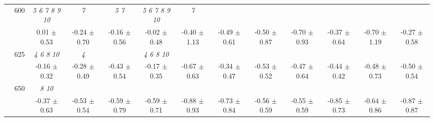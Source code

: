 \begin{table}[h]
{\begin{tabular}{
        ccccccccccccc}
 & \multirow{2}{*}{600}& \textit{  5  6  7  8  9 10 }& \textit{ 7 }& \textit{ 5 7 }& \textit{  5  6  7  8  9 10 }& \textit{ 7 }& & & & & &  \\ 
 & & 0.01 $\pm$ 0.53& -0.24 $\pm$ 0.70& -0.16 $\pm$ 0.56& -0.02 $\pm$ 0.48& -0.40 $\pm$ 1.13& -0.49 $\pm$ 0.61& -0.50 $\pm$ 0.87& -0.70 $\pm$ 0.93& -0.37 $\pm$ 0.64& -0.70 $\pm$ 1.19& -0.27 $\pm$ 0.58 \\ 
 & \multirow{2}{*}{625}& \cellcolor[HTML]{EFEFEF} \textit{  4  6  8 10 }& \cellcolor[HTML]{EFEFEF} \textit{ 4 }& \cellcolor[HTML]{EFEFEF} & \cellcolor[HTML]{EFEFEF} \textit{  4  6  8 10 }& \cellcolor[HTML]{EFEFEF} & \cellcolor[HTML]{EFEFEF} & \cellcolor[HTML]{EFEFEF} & \cellcolor[HTML]{EFEFEF} & \cellcolor[HTML]{EFEFEF} & \cellcolor[HTML]{EFEFEF} & \cellcolor[HTML]{EFEFEF}  \\ 
 & & \cellcolor[HTML]{EFEFEF} -0.16 $\pm$ 0.32& \cellcolor[HTML]{EFEFEF} -0.28 $\pm$ 0.49& \cellcolor[HTML]{EFEFEF} -0.43 $\pm$ 0.54& \cellcolor[HTML]{EFEFEF} -0.17 $\pm$ 0.35& \cellcolor[HTML]{EFEFEF} -0.67 $\pm$ 0.63& \cellcolor[HTML]{EFEFEF} -0.34 $\pm$ 0.47& \cellcolor[HTML]{EFEFEF} -0.53 $\pm$ 0.52& \cellcolor[HTML]{EFEFEF} -0.47 $\pm$ 0.64& \cellcolor[HTML]{EFEFEF} -0.44 $\pm$ 0.42& \cellcolor[HTML]{EFEFEF} -0.48 $\pm$ 0.73& \cellcolor[HTML]{EFEFEF} -0.50 $\pm$ 0.54 \\ 
 & \multirow{2}{*}{650}& \textit{  8 10 }& & & & & & & & & &  \\ 
 & & -0.37 $\pm$ 0.63& -0.53 $\pm$ 0.54& -0.59 $\pm$ 0.79& -0.59 $\pm$ 0.71& -0.88 $\pm$ 0.93& -0.73 $\pm$ 0.84& -0.56 $\pm$ 0.59& -0.55 $\pm$ 0.59& -0.85 $\pm$ 0.73& -0.64 $\pm$ 0.86& -0.87 $\pm$ 0.87 \\ \midrule 

        \bottomrule
        \end{tabular}%
        }

        \end{table}
        
